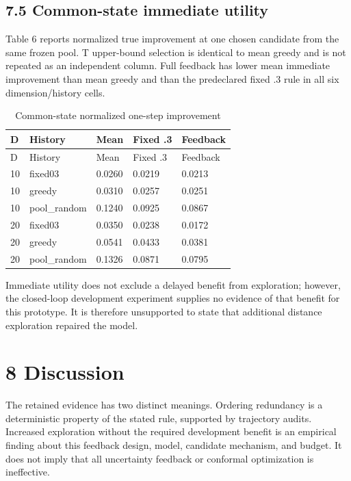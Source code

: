 \documentclass[11pt,a4paper]{article}
\begin{document}
\hypertarget{common-state-immediate-utility}{%
\subsection{7.5 Common-state immediate
utility}\label{common-state-immediate-utility}}

Table 6 reports normalized true improvement at one chosen candidate from
the same frozen pool. T upper-bound selection is identical to mean
greedy and is not repeated as an independent column. Full feedback has
lower mean immediate improvement than mean greedy and than the
predeclared fixed .3 rule in all six dimension/history cells.

\par\noindent\begin{minipage}{\linewidth}

\begin{longtable}[]{@{}lllll@{}}
\caption{Common-state normalized one-step improvement}\tabularnewline
\toprule
D & History & Mean & Fixed .3 & Feedback \\
\midrule
\endfirsthead
\toprule
D & History & Mean & Fixed .3 & Feedback \\
\midrule
\endhead
10 & fixed03 & 0.0260 & 0.0219 & 0.0213 \\
10 & greedy & 0.0310 & 0.0257 & 0.0251 \\
10 & pool\_random & 0.1240 & 0.0925 & 0.0867 \\
20 & fixed03 & 0.0350 & 0.0238 & 0.0172 \\
20 & greedy & 0.0541 & 0.0433 & 0.0381 \\
20 & pool\_random & 0.1326 & 0.0871 & 0.0795 \\
\bottomrule
\end{longtable}

\end{minipage}\par

Immediate utility does not exclude a delayed benefit from exploration;
however, the closed-loop development experiment supplies no evidence of
that benefit for this prototype. It is therefore unsupported to state
that additional distance exploration repaired the model.

\hypertarget{discussion}{%
\section{8 Discussion}\label{discussion}}

The retained evidence has two distinct meanings. Ordering redundancy is
a deterministic property of the stated rule, supported by trajectory
audits. Increased exploration without the required development benefit
is an empirical finding about this feedback design, model, candidate
mechanism, and budget. It does not imply that all uncertainty feedback
or conformal optimization is ineffective.
\end{document}
